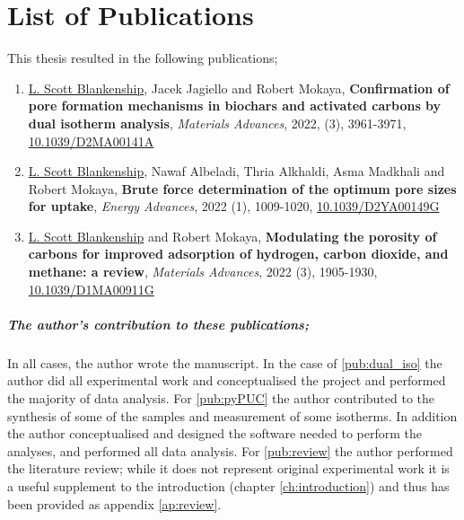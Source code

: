 \cleardoublepage

\chapter*{List of Publications}

This thesis resulted in the following publications;

\begin{enumerate}[label=\Roman*, ref={\textbf{Publication \Roman*}}]
    \item \underline{L. Scott Blankenship}, Jacek Jagiello and Robert Mokaya, \textbf{Confirmation of pore formation mechanisms in biochars and activated carbons by dual isotherm analysis}, \textit{Materials Advances}, 2022, (3), 3961-3971, \href{https://doi.org/10.1039/D2MA00141A}{10.1039/D2MA00141A}
    \label{pub:dual_iso}
    \item \underline{L. Scott Blankenship}, Nawaf Albeladi, Thria Alkhaldi, Asma Madkhali and Robert Mokaya, \textbf{Brute force determination of the optimum pore sizes for  uptake}, \textit{Energy Advances}, 2022 (1), 1009-1020, \href{https://doi.org/10.1039/D2YA00149G}{10.1039/D2YA00149G}
    \label{pub:pyPUC}
    \item \underline{L. Scott Blankenship} and Robert Mokaya, \textbf{Modulating the porosity of carbons for improved adsorption of hydrogen, carbon dioxide, and methane: a review}, \textit{Materials Advances}, 2022 (3), 1905-1930, \href{https://doi.org/10.1039/D1MA00911G}{10.1039/D1MA00911G}
    \label{pub:review}
\end{enumerate}

\paragraph{The author's contribution to these publications;}
In all cases, the author wrote the manuscript. In the case of \ref{pub:dual_iso} the author did all experimental work and conceptualised the project and performed the majority of data analysis. For \ref{pub:pyPUC} the author contributed to the synthesis of some of the samples and measurement of some isotherms. In addition the author conceptualised and designed the software needed to perform the analyses, and performed all data analysis. For \ref{pub:review} the author performed the literature review; while it does not represent original experimental work it is a useful supplement to the introduction (chapter \ref{ch:introduction}) and thus has been provided as appendix \ref{ap:review}.

